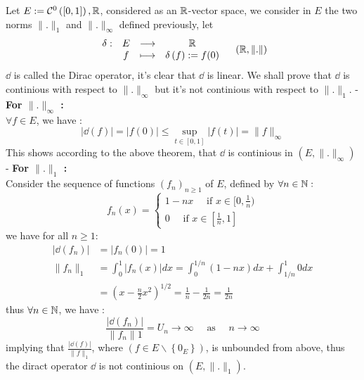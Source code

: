 \begin{example}
	Let $E := \mathcal{C} ^{0} \left( [0,1] \right),\mathbb{R} $, 
	considered as an $\mathbb{R} $-vector space, we consider in $E$ 
	the two norms $\| . \|_{1}$  and $\| . \| _{\infty }$ 
	defined previously, let 
	\[
	\begin{array}{cccc}
	      \delta : &  E  & \longrightarrow & \mathbb{R}  \\
	
	           &  f  & \longmapsto     & \delta \left( f \right) :=
		   f(0) \\ 
	\end{array}
	\quad \left( \mathbb{R} , \| . \|  \right)
	\]
	$\dd$ is called the Dirac operator, it's clear
	that $\dd$ is linear. We shall prove that $\dd$ is continious
	with respect to $\| . \| _{\infty }$ but it's not 
	continious with respect to $\| . \| _{1}$.
	- \textbf{For $\| . \| _{\infty}$ : } \\
	$\forall  f \in E$, we have : 
	\[
	\left| \dd \left( f \right) \right| 
	= \left| f \left( 0 \right) \right| 
	\leq \sup_{t \in [0,1]} 
	\left| f(t)  \right| = \| f \| _{\infty }
	\]
	This shows according to the above theorem, that 
	$\dd$ is continious in $\left( E, 
	\| . \| _{\infty }\right)$ 
	\\
	- \textbf{For $\| . \| _{1}$ : } \\
	Consider the sequence of functions 
	$\left( f_{n} \right)_{n \geq 1}$ of $E$, defined
	by $\forall n \in \mathbb{N} : $ 
	\[
		f_{n}(x) = 
		\begin{cases}
		1 - nx \quad \text{ if } x \in  
		[0,\frac{1}{n})
		\\
		0 \quad \text{ if } x \in 
		[\frac{1}{n}, 1]
		\end{cases}
	\]
	we have for all $n \geq 1$:
	\begin{align*}
		\left| \dd \left( f_{n} \right) \right| &= 
	\left| f_{n}(0)  \right| = 1 \\
		\| f_{n} \| _{1} &=
	\int_{0}^{1} 
	\left| f_{n}(x)  \right|dx = 
	\int_{0}^{1/n} 
	\left( 1-nx \right)dx + 
	\int_{1/n}^{1} 0 dx  \\
				 &= 
				 \left( x-
				 \frac{n}{2} 
			 x^2 \right)^{1/2} = 
			 \frac{1}{n} - \frac{1}{2n} =
			 \frac{1}{2n}
	\end{align*}
	thus $\forall  n \in \mathbb{N}$, we have : 
	\[
	\frac{\left| \dd(f_{n})  \right|}{
		\| f_{n} \| 1
	} = U_{n} \rightarrow  \infty \quad 
	\text{ as } \quad n \rightarrow \infty 
	\]
	implying that 
        $\frac{\left| \dd(f)  \right|}{\| f \|_{1}}$, where
        $\left( f \in E \backslash \left\{ 0_{E} \right\} \right)$,
	is unbounded from above, thus the diract operator 
	$\dd$ is not continious on $\left( E, \| . \| _{1} \right)$.
 \end{example}
